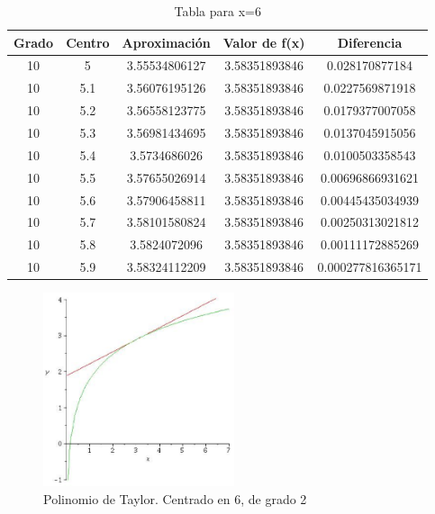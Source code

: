 \documentclass[a4paper,12pt]{report}
\begin{document}
\clearpage

\begin{table}[htb]
\begin{center}
  \caption{Tabla para x=6}
  \begin{tabular}{|c|c|c|c|c|} %
  \hline
         Grado   &  Centro  &  Aproximación    &  Valor de f(x)  &  Diferencia        \\ \hline
            10   &   5      &  3.55534806127   &  3.58351893846  &  0.028170877184    \\ \hline
            10   &   5.1    &  3.56076195126   &  3.58351893846  &  0.0227569871918   \\ \hline
            10   &   5.2    &  3.56558123775   &  3.58351893846  &  0.0179377007058   \\ \hline
            10   &   5.3    &  3.56981434695   &  3.58351893846  &  0.0137045915056   \\ \hline
            10   &   5.4    &  3.5734686026    &  3.58351893846  &  0.0100503358543   \\ \hline
            10   &   5.5    &  3.57655026914   &  3.58351893846  &  0.00696866931621  \\ \hline
            10   &   5.6    &  3.57906458811   &  3.58351893846  &  0.00445435034939  \\ \hline
            10   &   5.7    &  3.58101580824   &  3.58351893846  &  0.00250313021812  \\ \hline
            10   &   5.8    &  3.5824072096    &  3.58351893846  &  0.00111172885269  \\ \hline
            10   &   5.9    &  3.58324112209   &  3.58351893846  &  0.000277816365171 \\ \hline
   \end{tabular}
   \label{Tabla5}
   \end{center}
\end{table}

\clearpage

\begin{figure}[t]
  \begin{center}
    \includegraphics[width=0.5\textwidth]{grafica2.eps}
    \caption{Polinomio de Taylor. Centrado en 6, de grado 2}
    \label{fig:ejemplo}
  \end{center}
\end{figure}
\end{document}
